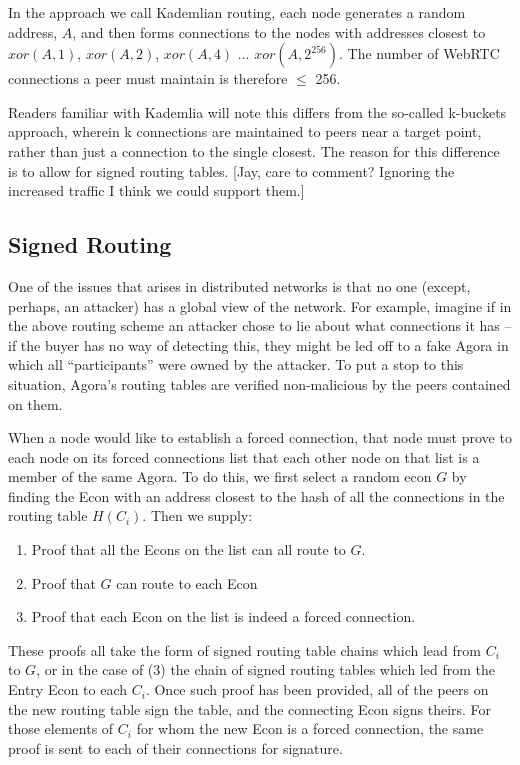 \documentclass{article}
\begin{document}
In the approach we call Kademlian routing, each node generates a random address, $A$, and then forms connections to the nodes with addresses closest to $xor(A, 1)$, $xor(A, 2)$, $xor(A, 4)$ ... $xor(A, 2^{256})$. The number of WebRTC connections a peer must maintain is therefore $\leq$ 256.

Readers familiar with Kademlia will note this differs from the so-called k-buckets approach, wherein k connections are maintained to peers near a target point, rather than just a connection to the single closest. The reason for this difference is to allow for signed routing tables. [Jay, care to comment? Ignoring the increased traffic I think we could support them.]

\subsection{Signed Routing}

One of the issues that arises in distributed networks is that no one (except, perhaps, an attacker) has a global view of the network. For example, imagine if in the above routing scheme an attacker chose to lie about what connections it has – if the buyer has no way of detecting this, they might be led off to a fake Agora in which all “participants” were owned by the attacker. To put a stop to this situation, Agora's routing tables are verified non-malicious by the peers contained on them.

When a node would like to establish a forced connection, that node must prove to each node on its forced connections list that each other node on that list is a member of the same Agora. To do this, we first select a random econ $G$ by finding the Econ with an address closest to the hash of all the connections in the routing table $H(C_i)$. Then we supply:

\begin{enumerate}
    \item Proof that all the Econs on the list can all route to $G$.
    \item Proof that $G$ can route to each Econ
    \item Proof that each Econ on the list is indeed a forced connection.
\end{enumerate}

These proofs all take the form of signed routing table chains which lead from $C_i$ to $G$, or in the case of (3) the chain of signed routing tables which led from the Entry Econ to each $C_i$. Once such proof has been provided, all of the peers on the new routing table sign the table, and the connecting Econ signs theirs. For those elements of $C_i$ for whom the new Econ is a forced connection, the same proof is sent to each of their connections for signature.
\end{document}
